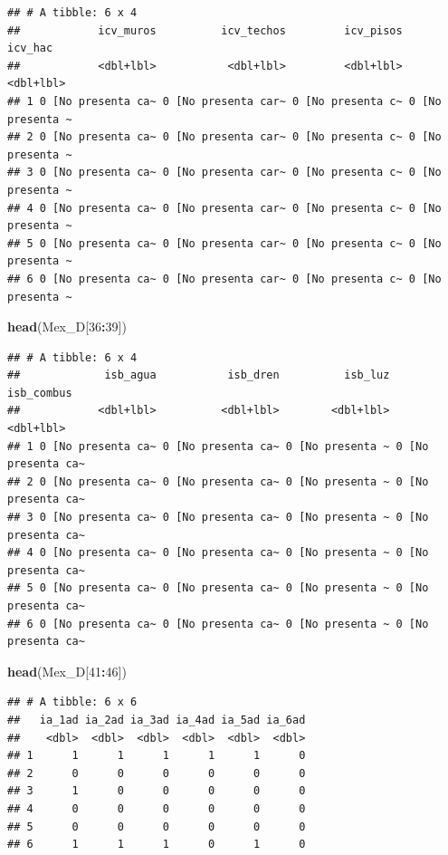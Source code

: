 \documentclass[]{book}
\newenvironment{Shaded}{\begin{snugshade}}{\end{snugshade}}
\newcommand{\DecValTok}[1]{\textcolor[rgb]{0.00,0.00,0.81}{#1}}
\newcommand{\KeywordTok}[1]{\textcolor[rgb]{0.13,0.29,0.53}{\textbf{#1}}}
\newcommand{\NormalTok}[1]{#1}
\newcommand{\OperatorTok}[1]{\textcolor[rgb]{0.81,0.36,0.00}{\textbf{#1}}}
\begin{document}
\begin{verbatim}
## # A tibble: 6 x 4
##            icv_muros          icv_techos         icv_pisos          icv_hac
##            <dbl+lbl>           <dbl+lbl>         <dbl+lbl>        <dbl+lbl>
## 1 0 [No presenta ca~ 0 [No presenta car~ 0 [No presenta c~ 0 [No presenta ~
## 2 0 [No presenta ca~ 0 [No presenta car~ 0 [No presenta c~ 0 [No presenta ~
## 3 0 [No presenta ca~ 0 [No presenta car~ 0 [No presenta c~ 0 [No presenta ~
## 4 0 [No presenta ca~ 0 [No presenta car~ 0 [No presenta c~ 0 [No presenta ~
## 5 0 [No presenta ca~ 0 [No presenta car~ 0 [No presenta c~ 0 [No presenta ~
## 6 0 [No presenta ca~ 0 [No presenta car~ 0 [No presenta c~ 0 [No presenta ~
\end{verbatim}

\begin{Shaded}
\begin{Highlighting}[]
\KeywordTok{head}\NormalTok{(Mex_D[}\DecValTok{36}\OperatorTok{:}\DecValTok{39}\NormalTok{])}
\end{Highlighting}
\end{Shaded}

\begin{verbatim}
## # A tibble: 6 x 4
##             isb_agua           isb_dren          isb_luz         isb_combus
##            <dbl+lbl>          <dbl+lbl>        <dbl+lbl>          <dbl+lbl>
## 1 0 [No presenta ca~ 0 [No presenta ca~ 0 [No presenta ~ 0 [No presenta ca~
## 2 0 [No presenta ca~ 0 [No presenta ca~ 0 [No presenta ~ 0 [No presenta ca~
## 3 0 [No presenta ca~ 0 [No presenta ca~ 0 [No presenta ~ 0 [No presenta ca~
## 4 0 [No presenta ca~ 0 [No presenta ca~ 0 [No presenta ~ 0 [No presenta ca~
## 5 0 [No presenta ca~ 0 [No presenta ca~ 0 [No presenta ~ 0 [No presenta ca~
## 6 0 [No presenta ca~ 0 [No presenta ca~ 0 [No presenta ~ 0 [No presenta ca~
\end{verbatim}

\begin{Shaded}
\begin{Highlighting}[]
\KeywordTok{head}\NormalTok{(Mex_D[}\DecValTok{41}\OperatorTok{:}\DecValTok{46}\NormalTok{])}
\end{Highlighting}
\end{Shaded}

\begin{verbatim}
## # A tibble: 6 x 6
##   ia_1ad ia_2ad ia_3ad ia_4ad ia_5ad ia_6ad
##    <dbl>  <dbl>  <dbl>  <dbl>  <dbl>  <dbl>
## 1      1      1      1      1      1      0
## 2      0      0      0      0      0      0
## 3      1      0      0      0      0      0
## 4      0      0      0      0      0      0
## 5      0      0      0      0      0      0
## 6      1      1      1      0      1      0
\end{verbatim}
\end{document}
